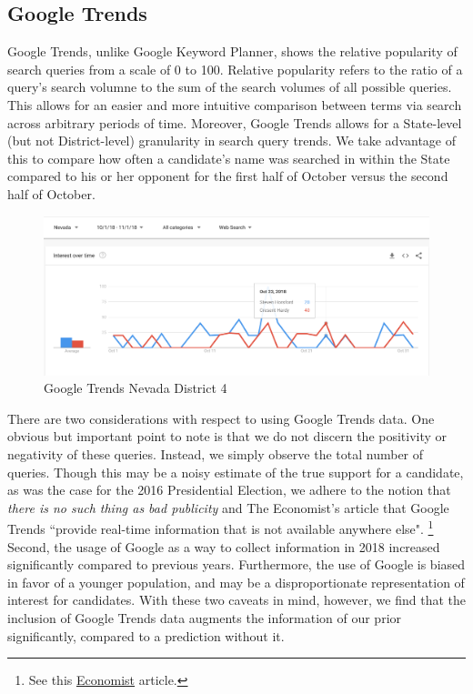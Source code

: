\documentclass[11pt]{article}
\begin{document}
\subsection{Google Trends}
Google Trends, unlike Google Keyword Planner, shows the relative popularity of search queries from a scale of 0 to 100. Relative popularity refers to the ratio of a query's search volumne to the sum of the search volumes of all possible queries. This allows for an easier and more intuitive comparison between terms via search across arbitrary periods of time. Moreover, Google Trends allows for a State-level (but not District-level) granularity in search query trends. We take advantage of this to compare how often a candidate's name was searched in within the State compared to his or her opponent for the first half of October versus the second half of October.

 \begin{figure}[tbh]
  \centering
  \includegraphics[scale=0.4]{google_trends_ex}
  \caption{Google Trends Nevada District 4}
  \label{fig:trends}
\end{figure}

There are two considerations with respect to using Google Trends data. One
obvious but important point to note is that we do not discern the positivity or
negativity of these queries. Instead, we simply observe the total number of
queries. Though this may be a noisy estimate of the true support for a
candidate, as was the case for the 2016 Presidential Election, we adhere to the
notion that \textit{there is no such thing as bad publicity} and The Economist's
article that Google Trends ``provide real-time information that is not available
anywhere else". \footnote{See this
\href{https://www.economist.com/graphic-detail/2016/03/01/how-useful-is-google-search-data-when-predicting-primary-elections}{Economist} article.} Second, the usage of Google as a way to collect information in 2018 increased significantly compared to previous years. Furthermore, the use of Google is biased in favor of a younger population, and may be a disproportionate representation of interest for candidates. With these two caveats in mind, however, we find that the inclusion of Google Trends data augments the information of our prior significantly, compared to a prediction without it.
\end{document}
